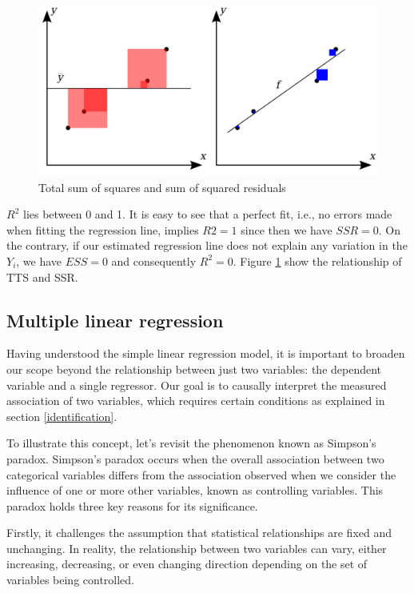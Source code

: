 \documentclass[
  12pt,
  oneside]{book}
\theoremstyle{definition}
\theoremstyle{definition}
\theoremstyle{definition}
\theoremstyle{definition}
\theoremstyle{remark}
\begin{document}
\begin{figure}

{\centering \includegraphics[width=26.67in]{fig/fitR} 

}

\caption{Total sum of squares and sum of squared residuals}\label{fig:fitR}
\end{figure}

\(R^2\) lies between 0 and 1. It is easy to see that a perfect fit, i.e., no errors made when fitting the regression line, implies \(R2=1\) since then we have \(SSR=0\). On the contrary, if our estimated regression line does not explain any variation in the \(Y_i\), we have \(ESS=0\) and consequently \(R^2=0\). Figure \ref{fig:fitR} show the relationship of TTS and SSR.

\hypertarget{multiple-linear-regression}{%
\subsection{Multiple linear regression}\label{multiple-linear-regression}}

Having understood the simple linear regression model, it is important to broaden our scope beyond the relationship between just two variables: the dependent variable and a single regressor. Our goal is to causally interpret the measured association of two variables, which requires certain conditions as explained in section \ref{identification}.

To illustrate this concept, let's revisit the phenomenon known as Simpson's paradox. Simpson's paradox occurs when the overall association between two categorical variables differs from the association observed when we consider the influence of one or more other variables, known as controlling variables. This paradox holds three key reasons for its significance.

Firstly, it challenges the assumption that statistical relationships are fixed and unchanging. In reality, the relationship between two variables can vary, either increasing, decreasing, or even changing direction depending on the set of variables being controlled.
\end{document}
